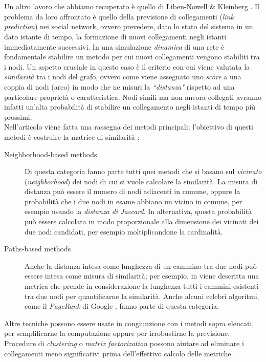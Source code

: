 \documentclass[a4paper,12pt]{article}
\begin{document}
\\
\\
Un altro lavoro che abbiamo recuperato è quello di Liben-Nowell \& Kleinberg \cite{link}. Il problema da loro affrontato è quello della previsione di collegamenti (\textit{link prediction}) nei social network, ovvero prevedere, dato lo stato del sistema in un dato istante di tempo, la formazione di nuovi collegamenti negli istanti immediatamente successivi. In una simulazione \textit{dinamica} di una rete è fondamentale stabilire un metodo per cui nuovi collegamenti vengono stabiliti tra i nodi. Un aspetto cruciale in questo caso è il criterio con cui viene valutata la \textit{similarità} tra i nodi del grafo, ovvero come viene assegnato uno \textit{score} a una coppia di nodi (arco) in modo che ne misuri la \textit{``distanza"} rispetto ad una particolare proprietà o caratteristica. Nodi simili ma non ancora collegati avranno infatti un'alta probabilità di stabilire un collegamento negli istanti di tempo più prossimi. \\
Nell'articolo viene fatta una rassegna dei metodi principali; l'obiettivo di questi metodi è costruire la matrice di similarità :
\begin{description}
\item[Neighborhood-based methods] Di questa categoria fanno parte tutti quei metodi che si basano sul \textit{vicinato} (\textit{neighborhood}) dei nodi di cui si vuole calcolare la similarità. La misura di distanza può essere il numero di nodi adiacenti in comune, oppure la probabilità che i due nodi in esame abbiano un vicino in comune, per esempio usando la \textit{distanza di Jaccard}. In alternativa, questa probabilità può essere calcolata in modo proporzionale alla dimensione dei vicinati dei due nodi candidati, per esempio moltiplicandone la cardinalità.
\item[Paths-based methods] Anche la distanza intesa come lunghezza di un cammino tra due nodi può essere intesa come misura di similarità; per esempio, in \cite{katz} viene descritta una metrica che prende in considerazione la lunghezza tutti i cammini esistenti tra due nodi per quantificarne la similarità. Anche alcuni celebri algoritmi, come il \textit{PageRank} di Google \cite{google}, fanno parte di questa categoria.
\end{description}
Altre tecniche possono essere usate in congiunzione con i metodi sopra elencati, per semplificarne la computazione oppure per irrobustirne la previsione. Procedure di \textit{clustering} o \textit{matrix factorization} possono aiutare ad eliminare i collegamenti meno significativi prima dell'effettivo calcolo delle metriche. \\
\end{document}
